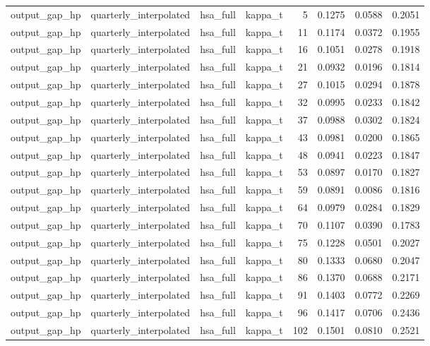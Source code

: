 \begin{tabular}{llllrrrr}
output\_gap\_hp & quarterly\_interpolated & hsa\_full & kappa\_t & 5 & 0.1275 & 0.0588 & 0.2051 \\
output\_gap\_hp & quarterly\_interpolated & hsa\_full & kappa\_t & 11 & 0.1174 & 0.0372 & 0.1955 \\
output\_gap\_hp & quarterly\_interpolated & hsa\_full & kappa\_t & 16 & 0.1051 & 0.0278 & 0.1918 \\
output\_gap\_hp & quarterly\_interpolated & hsa\_full & kappa\_t & 21 & 0.0932 & 0.0196 & 0.1814 \\
output\_gap\_hp & quarterly\_interpolated & hsa\_full & kappa\_t & 27 & 0.1015 & 0.0294 & 0.1878 \\
output\_gap\_hp & quarterly\_interpolated & hsa\_full & kappa\_t & 32 & 0.0995 & 0.0233 & 0.1842 \\
output\_gap\_hp & quarterly\_interpolated & hsa\_full & kappa\_t & 37 & 0.0988 & 0.0302 & 0.1824 \\
output\_gap\_hp & quarterly\_interpolated & hsa\_full & kappa\_t & 43 & 0.0981 & 0.0200 & 0.1865 \\
output\_gap\_hp & quarterly\_interpolated & hsa\_full & kappa\_t & 48 & 0.0941 & 0.0223 & 0.1847 \\
output\_gap\_hp & quarterly\_interpolated & hsa\_full & kappa\_t & 53 & 0.0897 & 0.0170 & 0.1827 \\
output\_gap\_hp & quarterly\_interpolated & hsa\_full & kappa\_t & 59 & 0.0891 & 0.0086 & 0.1816 \\
output\_gap\_hp & quarterly\_interpolated & hsa\_full & kappa\_t & 64 & 0.0979 & 0.0284 & 0.1829 \\
output\_gap\_hp & quarterly\_interpolated & hsa\_full & kappa\_t & 70 & 0.1107 & 0.0390 & 0.1783 \\
output\_gap\_hp & quarterly\_interpolated & hsa\_full & kappa\_t & 75 & 0.1228 & 0.0501 & 0.2027 \\
output\_gap\_hp & quarterly\_interpolated & hsa\_full & kappa\_t & 80 & 0.1333 & 0.0680 & 0.2047 \\
output\_gap\_hp & quarterly\_interpolated & hsa\_full & kappa\_t & 86 & 0.1370 & 0.0688 & 0.2171 \\
output\_gap\_hp & quarterly\_interpolated & hsa\_full & kappa\_t & 91 & 0.1403 & 0.0772 & 0.2269 \\
output\_gap\_hp & quarterly\_interpolated & hsa\_full & kappa\_t & 96 & 0.1417 & 0.0706 & 0.2436 \\
output\_gap\_hp & quarterly\_interpolated & hsa\_full & kappa\_t & 102 & 0.1501 & 0.0810 & 0.2521 \\

\end{tabular}
